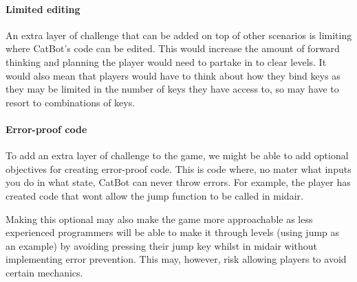 \paragraph{Limited editing} An extra layer of challenge that can be added on top of other scenarios is limiting where CatBot's code can be edited. This would increase the amount of forward thinking and planning the player would need to partake in to clear levels. It would also mean that players would have to think about how they bind keys as they may be limited in the number of keys they have access to, so may have to resort to combinations of keys.

\paragraph{Error-proof code} To add an extra layer of challenge to the game, we might be able to add optional objectives for creating error-proof code. This is code where, no mater what inputs you do in what state, CatBot can never throw errors. For example, the player has created code that wont allow the jump function to be called in midair.

Making this optional may also make the game more approachable as less experienced programmers will be able to make it through levels (using jump as an example) by avoiding pressing their jump key whilst in midair without implementing error prevention. This may, however, risk allowing players to avoid certain mechanics.

